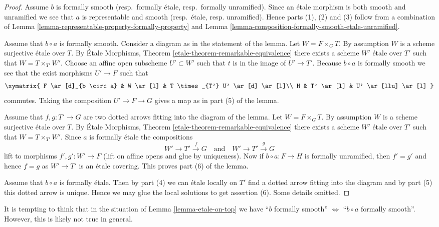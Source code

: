 \begin{proof}
Assume $b$ is formally smooth (resp.\ formally \'etale,
resp.\ formally unramified). Since an \'etale morphism is both
smooth and unramified we see that $a$ is representable and smooth
(resp.\ \'etale, resp. unramified). Hence parts (1), (2) and (3)
follow from a combination of
Lemma \ref{lemma-representable-property-formally-property}
and
Lemma \ref{lemma-composition-formally-smooth-etale-unramified}.

\medskip\noindent
Assume that $b \circ a$ is formally smooth. Consider a diagram
as in the statement of the lemma. Let $W = F \times_G T$.
By assumption $W$ is a scheme surjective \'etale over $T$. By
\'Etale Morphisms, Theorem \ref{etale-theorem-remarkable-equivalence}
there exists a scheme $W'$ \'etale over $T'$ such that $W = T \times_{T'} W'$.
Choose an affine open subscheme $U' \subset W'$ such that $t$ is in
the image of $U' \to T'$. Because $b \circ a$ is formally
smooth we see that the exist morphisms $U' \to F$ such that
$$
\xymatrix{
F \ar[d]_{b \circ a} & W \ar[l] & T \times_{T'} U' \ar[d] \ar[l]\\
H & T' \ar[l] & U' \ar[llu] \ar[l]
}
$$
commutes. Taking the composition $U' \to F \to G$ gives a
map as in part (5) of the lemma.

\medskip\noindent
Assume that $f, g : T' \to G$ are two dotted arrows fitting into the
diagram of the lemma. Let $W = F \times_G T$.
By assumption $W$ is a scheme surjective \'etale over $T$. By
\'Etale Morphisms, Theorem \ref{etale-theorem-remarkable-equivalence}
there exists a scheme $W'$ \'etale over $T'$ such that $W = T \times_{T'} W'$.
Since $a$ is formally \'etale the compositions
$$
W' \to T' \xrightarrow{f} G
\quad\text{and}\quad
W' \to T' \xrightarrow{g} G
$$
lift to morphisms $f', g' : W' \to F$ (lift on affine opens and glue by
uniqueness). Now if $b \circ a : F \to H$ is formally unramified, then
$f' = g'$ and hence $f = g$ as $W' \to T'$ is an \'etale covering. This proves
part (6) of the lemma.

\medskip\noindent
Assume that $b \circ a$ is formally \'etale. Then by part (4) we
can \'etale locally on $T'$ find a dotted arrow fitting into the diagram
and by part (5) this dotted arrow is unique. Hence we may glue the
local solutions to get assertion (6). Some details omitted.
\end{proof}

\begin{remark}
\label{remark-tempting}
It is tempting to think that in the situation of
Lemma \ref{lemma-etale-on-top}
we have
``$b$ formally smooth'' $\Leftrightarrow$ ``$b \circ a$ formally smooth''.
However, this is likely not true in general.
\end{remark}

